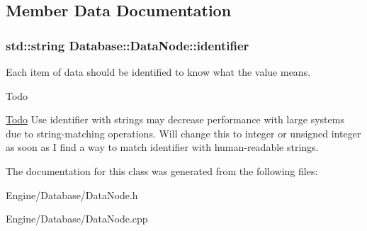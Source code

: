 \subsection{Member Data Documentation}
\subsubsection[{\texorpdfstring{identifier}{identifier}}]{\setlength{\rightskip}{0pt plus 5cm}std\+::string Database\+::\+Data\+Node\+::identifier\hspace{0.3cm}{\ttfamily [protected]}}\hypertarget{classDatabase_1_1DataNode_ace59a7fba9c490d2dae59c4af7b0c71f}{}\label{classDatabase_1_1DataNode_ace59a7fba9c490d2dae59c4af7b0c71f}


Each item of data should be identified to know what the value means. 

\begin{DoxyRefDesc}{Todo}
\item[\hyperlink{todo__todo000001}{Todo}]Use identifier with strings may decrease performance with large systems due to string-\/matching operations. Will change this to integer or unsigned integer as soon as I find a way to match identifier with human-\/readable strings. \end{DoxyRefDesc}


The documentation for this class was generated from the following files\+:\begin{DoxyCompactItemize}
\item 
Engine/\+Database/Data\+Node.\+h\item 
Engine/\+Database/Data\+Node.\+cpp\end{DoxyCompactItemize}
